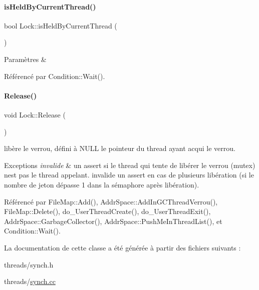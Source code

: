 \paragraph{\texorpdfstring{is\+Held\+By\+Current\+Thread()}{isHeldByCurrentThread()}}
{\footnotesize\ttfamily bool Lock\+::is\+Held\+By\+Current\+Thread (\begin{DoxyParamCaption}{ }\end{DoxyParamCaption})}


\begin{DoxyParams}{Paramètres}
{\em } & \\
\hline
\end{DoxyParams}


Référencé par Condition\+::\+Wait().

\hypertarget{class_lock_a5ca005b84272e56c2bf447056ee9217c}{}\label{class_lock_a5ca005b84272e56c2bf447056ee9217c} 
\paragraph{\texorpdfstring{Release()}{Release()}}
{\footnotesize\ttfamily void Lock\+::\+Release (\begin{DoxyParamCaption}{ }\end{DoxyParamCaption})}



libère le verrou, défini à N\+U\+LL le pointeur du thread ayant acqui le verrou. 


\begin{DoxyExceptions}{Exceptions}
{\em invalide} & un assert si le thread qui tente de libérer le verrou (mutex) n\textquotesingle{}est pas le thread appelant. invalide un assert en cas de plusieurs libération (si le nombre de jeton dépasse 1 dans la sémaphore après libération). \\
\hline
\end{DoxyExceptions}


Référencé par File\+Map\+::\+Add(), Addr\+Space\+::\+Add\+In\+G\+C\+Thread\+Verrou(), File\+Map\+::\+Delete(), do\+\_\+\+User\+Thread\+Create(), do\+\_\+\+User\+Thread\+Exit(), Addr\+Space\+::\+Garbage\+Collector(), Addr\+Space\+::\+Push\+Me\+In\+Thread\+List(), et Condition\+::\+Wait().



La documentation de cette classe a été générée à partir des fichiers suivants \+:\begin{DoxyCompactItemize}
\item 
threads/synch.\+h\item 
threads/\hyperlink{synch_8cc}{synch.\+cc}\end{DoxyCompactItemize}
